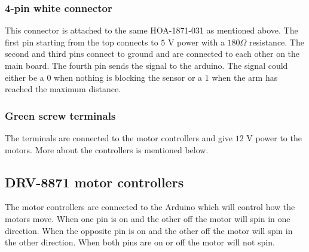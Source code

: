 \documentclass{article}
\begin{document}
\subsubsection{4-pin white connector}
This connector is attached to the same HOA-1871-031 as mentioned above. The first pin starting from the top connects to $5$ V power with a $180 
\Omega$ resistance. The second and third pins connect to ground and are connected to each other on the main board. The fourth pin sends the signal to the arduino. The signal could either be a $0$ when nothing is blocking the sensor or a $1$ when the arm has reached the maximum distance. 


\subsubsection{Green screw terminals}
The terminals are connected to the motor controllers and give $12$ V power to the motors. More about the controllers is mentioned below.

\subsection{DRV-8871 motor controllers}
The motor controllers are connected to the Arduino which will control how the motors move. When one pin is on and the other off the motor will spin in one direction. When the opposite pin is on and the other off the motor will spin in the other direction. When both pins are on or off the motor will not spin. 
\end{document}
